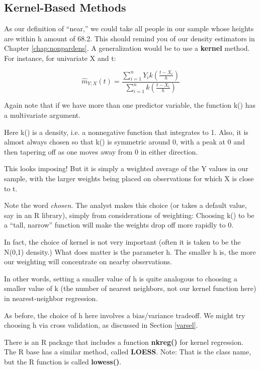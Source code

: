 \subsection{Kernel-Based Methods}

As our definition of ``near,'' we could take all people in our sample
whose heights are within h amount of 68.2.  This should remind you of
our density estimators in Chapter \ref{chap:nonpardens}.  A
generalization would be to use a {\bf kernel} method.  For instance, for
univariate X and t:

\begin{equation}
\widehat{m}_{Y;X}(t) = \frac
{\sum_{i=1}^{n} Y_i k\left ( \frac{t-X_i}{h}   \right ) }
{\sum_{i=1}^{n} k\left ( \frac{t-X_i}{h}   \right ) }
\end{equation}

Again note that if we have more than one predictor variable, the
function k() has a multivariate argument.

Here k() is a density, i.e. a nonnegative function that integrates to 1.
Also, it is almost always chosen so that k() is symmetric around 0, with
a peak at 0 and then tapering off as one moves away from 0 in either
direction.

This looks imposing!  But it is simply a weighted average of the Y values
in our sample, with the larger weights being placed on observations for
which X is close to t.  

Note the word {\it chosen}.  The analyst makes this choice (or takes a
default value, say in an R library), simply from considerations of
weighting: Choosing k() to be a ``tall, narrow'' function will make the
weights drop off more rapidly to 0.

In fact, the choice of kernel is not very important (often it is taken
to be the N(0,1) density.)  What does matter is the parameter h.  The
smaller h is, the more our weighting will concentrate on nearby
observations.

In other words, setting a smaller value of h is quite analogous to
choosing a smaller value of k (the number of nearest neighbors, not our
kernel function here) in nearest-neighbor regression.

As before, the choice of h here involves a bias/variance tradeoff.  We
might try choosing h via cross validation, as discussed in Section
\ref{varsel}.

There is an R package that includes a function {\bf nkreg()} for kernel
regression.  The R base has a similar method, called {\bf LOESS}.  Note:
That is the class name, but the R function is called {\bf lowess()}.

